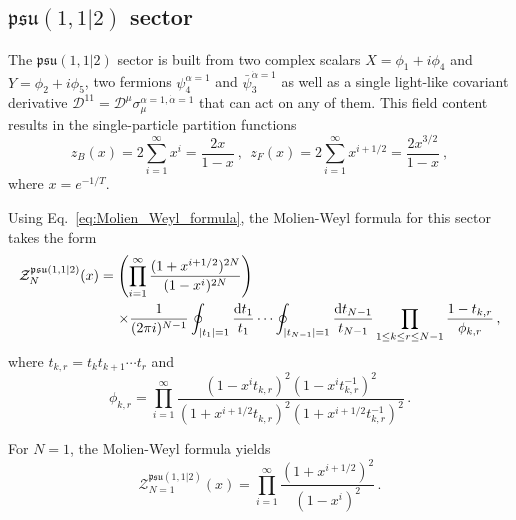 \documentclass[a4paper,11pt]{article}
\DeclareMathOperator{\phaneq}{\phantom{{}=}}
\begin{document}
\subsection{\texorpdfstring{$\mathfrak{psu}(1,1|2)$}{psu(1,1|2)} sector}
\label{subsec: psu(112)}

The $\mathfrak{psu}(1,1|2)$ sector is built from two complex scalars $X=\phi_1+i\phi_4$ and $Y=\phi_2+i\phi_5$, two fermions $\psi^{\alpha=1}_{4}$ and $\bar{\psi}_{3}^{\dot\alpha=1}$ as well as a single light-like covariant derivative $\mathcal{D}^{11}=\mathcal{D}^{\mu}\sigma_{\mu}^{\alpha=1,\dot\alpha=1}$ that can act on any of them. This field content results in the single-particle partition functions
\begin{equation}
	z_B(x)  = 2\sum_{i=1}^\infty x^{i}= \frac{2x}{1-x} \ , \ \ z_F(x)  = 2\sum_{i=1}^\infty x^{i+1/2}= \frac{2x^{3/2}}{1-x} \ ,
\end{equation}
where $x=e^{-1/T}$.

Using Eq.\ \eqref{eq:Molien_Weyl_formula}, the Molien-Weyl formula for this sector takes the form
\begin{equation} \label{eq:Molien_Weyl_psu(1,1|2)}
\begin{split}
	\mathcal{Z}_N^{\mathfrak{psu}(1,1|2)}(x) &= \qty(\prod_{i=1}^\infty\frac{(1+x^{i+1/2})^{2N}}{(1-x^{i})^{2N}}) \\
	 &\phaneq\times\frac{1}{(2\pi i)^{N-1}}\oint_{|t_1|=1} \frac{\dd t_1}{t_1} \cdots \oint_{|t_{N-1}|=1} \frac{\dd t_{N-1}}{t_{N-1}}  \prod_{1\leq k\leq r\leq N-1} \frac{1-t_{k,r}}{\phi_{k,r}} \,,
\end{split}
\end{equation}
where $t_{k,r}=t_k t_{k+1}\cdots t_r$ and
\begin{equation}
	\phi_{k,r} = \prod_{i=1}^\infty \frac{(1-x^{i}t_{k,r})^2(1-x^{i}t_{k,r}^{-1})^2}{(1+x^{i+1/2}t_{k,r})^2(1+x^{i+1/2}t_{k,r}^{-1})^2} \, .
\end{equation}



For $N=1$, the Molien-Weyl formula yields
\begin{equation}
\mathcal{Z}_{N=1}^{\mathfrak{psu}(1,1|2)}(x) = \prod_{i=1}^\infty\frac{(1+x^{i+1/2})^{2}}{(1-x^{i})^2}\,.
\end{equation}
\end{document}
